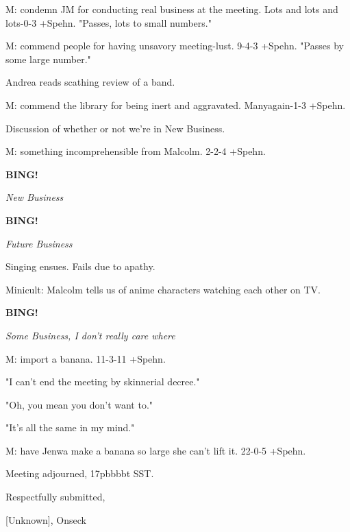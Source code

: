 \documentclass[12pt]{article}
\newcommand{\bing}{{\bf BING!} }
\newcommand{\goto}[1]{\bing \vskip 12pt \centerline{{\em{#1}}}}
\begin{document}
M: condemn JM for conducting real business at the meeting. Lots and lots and lots-0-3 +Spehn. "Passes, lots to small numbers."

M: commend people for having unsavory meeting-lust. 9-4-3 +Spehn. "Passes by some large number."

Andrea reads scathing review of a band.

M: commend the library for being inert and aggravated. Manyagain-1-3 +Spehn.

Discussion of whether or not we're in New Business.

M: something incomprehensible from Malcolm. 2-2-4 +Spehn.

\goto{New Business}

\goto{Future Business}

Singing ensues. Fails due to apathy.

Minicult: Malcolm tells us of anime characters watching each other on TV.

\goto{Some Business, I don't really care where}

M: import a banana. 11-3-11 +Spehn.

"I can't end the meeting by skinnerial decree."

"Oh, you mean you don't want to."

"It's all the same in my mind."

M: have Jenwa make a banana so large she can't lift it. 22-0-5 +Spehn.

\vspace{12pt}

\noindent
Meeting adjourned, 17pbbbbt SST.

\vspace{18pt}

\centerline{Respectfully submitted,}
\centerline{[Unknown], Onseck}
\end{document}
